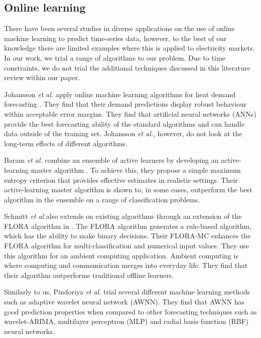 \documentclass[final,3p,times,twocolumn,numbers]{elsarticle}
\begin{document}
\subsection{Online learning}

There have been several studies in diverse applications on the use of online machine learning to predict time-series data, however, to the best of our knowledge there are limited examples where this is applied to electricity markets. In our work, we trial a range of algorithms to our problem. Due to time constraints, we do not trial the additional techniques discussed in this literature review within our paper. 

Johansson \textit{et al}. apply online machine learning algorithms for heat demand forecasting \cite{Johansson2017}. They find that their demand predictions display robust behaviour within acceptable error margins. They find that artificial neural networks (ANNs) provide the best forecasting ability of the standard algorithms and can handle data outside of the training set. Johansson \textit{et al.}, however, do not look at the long-term effects of different algorithms.

Baram \textit{et al.} combine an ensemble of active learners by developing an active-learning master algorithm \cite{Baram2003}. To achieve this, they propose a simple maximum entropy criterion that provides effective estimates in realistic settings. Their active-learning master algorithm is shown to, in some cases, outperform the best algorithm in the ensemble on a range of classification problems.

Schmitt \textit{et al} also extends on existing algorithms through an extension of the FLORA algorithm in \cite{Schmitt2008, Widmer1996}. The FLORA algorithm generates a rule-based algorithm, which has the ability to make binary decisions. Their FLORA-MC enhances the FLORA algorithm for multi-classification and numerical input values. They use this algorithm for an ambient computing application. Ambient computing is where computing and communication merges into everyday life. They find that their algorithm outperforms traditional offline learners.

Similarly to us, Pindoriya \textit{et al}. trial several different machine learning methods such as adaptive wavelet neural network (AWNN). They find that AWNN has good prediction properties when compared to other forecasting techniques such as wavelet-ARIMA, multilayer perceptron (MLP) and radial basis function (RBF) neural networks.
\end{document}
